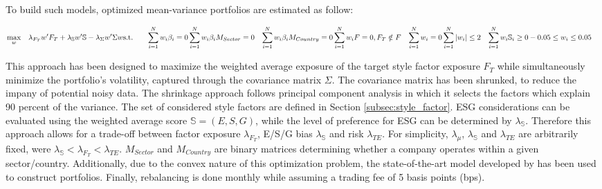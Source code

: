 \documentclass[11pt,a4paper]{article}
\let\\=\relax %
\begin{document}
To build such models, optimized mean-variance portfolios are estimated as follow: 

\begin{equation}
    \begin{aligned}
    \max_{w} \quad & \lambda_{F_{T}} w'F_{T} + \lambda_{\mathbb{S}} w'\mathbb{S} - \lambda_{\Sigma}w'\Sigma w\\
    \textrm{s.t.} \quad & \sum_{i=1}^{N}{w_{i}\beta_{i}} = 0 \\
    & \sum_{i=1}^{N}{w_{i}\beta_{i}M_{Sector}} = 0 \\
    & \sum_{i=1}^{N}{w_{i}\beta_{i}M_{Country}} = 0 \\
    & \sum_{i=1}^{N}{w_{i}F} = 0,  F_{T} \notin F \\
    & \sum_{i=1}^{N}{w_{i}} = 0 \\
    & \sum_{i=1}^{N}{\left|w_{i}\right|} \leq 2 \\
    & \sum_{i=1}^{N}{w_{i}\mathbb{S}_{i}} \geq 0 \\
    & -0.05 \leq w_i\leq 0.05 \\
    \end{aligned}
\end{equation}

This approach has been designed to maximize the weighted average exposure of the target style factor exposure $F_{T}$ while simultaneously minimize the portfolio's volatility, 
captured through the covariance matrix $\Sigma$. The covariance matrix has been shrunked, to reduce the impany of potential noisy data.
The shrinkage approach follows principal component analysis in which it selects the factors which explain 90 percent of the variance. 
The set of considered style factors are defined in Section \ref{subsec:style_factor}.
ESG considerations can be evaluated using the weighted average score $\mathbb{S} = \left(E, S, G \right)$, while the level of preference for ESG can be determined by $\lambda_{\mathbb{S}}$. 
Therefore this approach allows for a trade-off between factor exposure $\lambda_{F_{T}}$, E/S/G bias $\lambda_{\mathbb{S}}$ and risk $\lambda_{TE}$. 
For simplicity, $\lambda_{\mu}$, $\lambda_{\mathbb{S}}$ and $\lambda_{TE}$ are arbitrarily fixed, were $\lambda_{\mathbb{S}} < \lambda_{F_{T}} < \lambda_{TE}$.
$M_{Sector}$ and  $M_{Country}$ are binary matrices determining whether a company operates within a given sector/country. 
Additionally, due to the convex nature of this optimization problem, the state-of-the-art model developed by  has been used to construct portfolios. 
Finally, rebalancing is done monthly while assuming a trading fee of 5 basis points (bps). 
\end{document}
